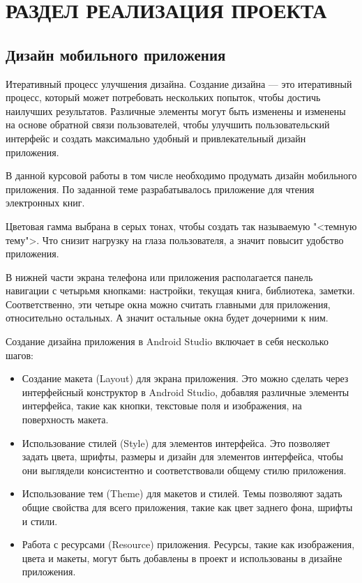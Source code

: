 \chapter{РАЗДЕЛ РЕАЛИЗАЦИЯ ПРОЕКТА}
\section{Дизайн мобильного приложения}
Итеративный процесс улучшения дизайна.
Создание дизайна --- это итеративный процесс,
который может потребовать нескольких попыток,
чтобы достичь наилучших результатов.
Различные элементы могут быть изменены и изменены на основе обратной связи
пользователей, чтобы улучшить пользовательский интерфейс
и создать максимально удобный и привлекательный дизайн приложения.\par
В данной курсовой работы в том числе необходимо продумать дизайн
мобильного приложения. По заданной теме разрабатывалось
приложение для чтения электронных книг.\par
Цветовая гамма выбрана в серых тонах, чтобы создать так называемую "<темную
тему">. Что снизит нагрузку на глаза пользователя, а значит повысит удобство
приложения.\par
В нижней части экрана телефона или приложения располагается
панель навигации с четырьмя кнопками: настройки, текущая книга,
библиотека, заметки. Соответственно, эти четыре окна можно считать главными
для приложения, относительно остальных. А значит остальные окна будет
дочерними к ним.\par
Создание дизайна приложения в Android Studio включает в себя несколько шагов:

\begin{itemize}
	\item Создание макета (Layout) для экрана приложения.
		Это можно сделать через интерфейсный конструктор в Android Studio,
		добавляя различные элементы интерфейса, такие как кнопки,
		текстовые поля и изображения, на поверхность макета.
	\item Использование стилей (Style) для элементов интерфейса.
		Это позволяет задать цвета, шрифты, размеры и дизайн
		для элементов интерфейса, чтобы они выглядели консистентно
		и соответствовали общему стилю приложения.
	\item Использование тем (Theme) для макетов и стилей.
		Темы позволяют задать общие свойства для всего приложения,
		такие как цвет заднего фона, шрифты и стили.
	\item Работа с ресурсами (Resource) приложения.
		Ресурсы, такие как изображения, цвета и макеты,
		могут быть добавлены в проект и использованы в дизайне приложения.
\end{itemize}

